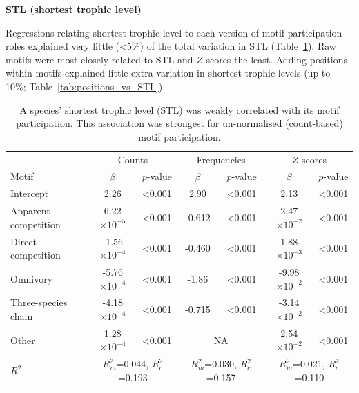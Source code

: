 \documentclass[12pt]{article}
\begin{document}
\begin{spacing}{2.0}
		\textbf{STL (shortest trophic level)}

			Regressions relating shortest trophic level to each version of motif participation roles explained very little (\textless5\%) of the total variation in STL (Table~\ref{tab:motifs_vs_STL}). 
			Raw motifs were most closely related to STL and $Z$-scores the least.
            Adding positions within motifs explained little extra variation in shortest trophic levels (up to 10\%; Table~\ref{tab:positions_vs_STL}).

			\begin{table}[h!]
    			\caption{A species' shortest trophic level (STL) was weakly correlated with its motif participation. This association was strongest for un-normalised (count-based) motif participation.}
    			\label{tab:motifs_vs_STL}
    			\begin{tabular}{l | c c | c c | c c}
    			& \multicolumn{2}{c|}{Counts} & \multicolumn{2}{c|}{Frequencies} & \multicolumn{2}{c}{$Z$-scores} \\
    			Motif & $\beta$ & $p$-value & $\beta$ & $p$-value & $\beta$ & $p$-value \\
    			\hline
    			Intercept & 2.26 & \textless0.001 & 2.90 & \textless0.001 & 2.13 & \textless0.001 \\
    			\hline
    			Apparent competition & 6.22$\times10^{-5}$ & \textless0.001 & -0.612 & \textless0.001 & 2.47$\times10^{-2}$ & \textless0.001 \\
    			Direct competition   & -1.56$\times10^{-4}$ & \textless0.001 & -0.460 & \textless0.001 & 1.88$\times10^{-3}$ & \textless0.001 \\
    			Omnivory       & -5.76$\times10^{-4}$ & \textless0.001 & -1.86 & \textless0.001 & -9.98$\times10^{-2}$ & \textless0.001 \\
    			Three-species chain  & -4.18$\times10^{-4}$ & \textless0.001 & -0.715 & \textless0.001 & -3.14$\times10^{-2}$ & \textless0.001 \\
    			Other    & 1.28$\times10^{-4}$ & \textless0.001 & \multicolumn{2}{c|}{NA} & 2.54$\times10^{-2}$ & \textless0.001 \\
    			\hline
    			$R^2$ & \multicolumn{2}{c|}{\tiny{$R^2_m$=0.044, $R^2_c$=0.193}} & 
    			\multicolumn{2}{c|}{\tiny{$R^2_m$=0.030, $R^2_c$=0.157}} & 
    			\multicolumn{2}{c}{\tiny{$R^2_m$=0.021, $R^2_c$=0.110}} \\
    			\end{tabular}
    			\end{table}



\end{spacing}
\end{document}
